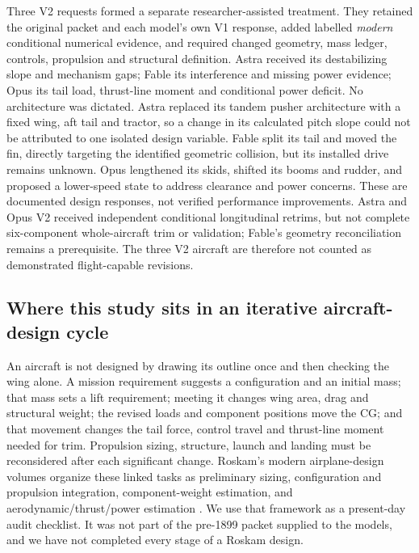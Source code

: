 \documentclass[11pt,a4paper]{article}
\begin{document}
Three V2 requests formed a separate researcher-assisted treatment. They retained the original packet and each model's own V1 response, added labelled \emph{modern} conditional numerical evidence, and required changed geometry, mass ledger, controls, propulsion and structural definition. Astra received its destabilizing slope and mechanism gaps; Fable its interference and missing power evidence; Opus its tail load, thrust-line moment and conditional power deficit. No architecture was dictated. Astra replaced its tandem pusher architecture with a fixed wing, aft tail and tractor, so a change in its calculated pitch slope could not be attributed to one isolated design variable. Fable split its tail and moved the fin, directly targeting the identified geometric collision, but its installed drive remains unknown. Opus lengthened its skids, shifted its booms and rudder, and proposed a lower-speed state to address clearance and power concerns. These are documented design responses, not verified performance improvements. Astra and Opus V2 received independent conditional longitudinal retrims, but not complete six-component whole-aircraft trim or validation; Fable's geometry reconciliation remains a prerequisite. The three V2 aircraft are therefore not counted as demonstrated flight-capable revisions.

\subsection{Where this study sits in an iterative aircraft-design cycle}
An aircraft is not designed by drawing its outline once and then checking the wing alone. A mission requirement suggests a configuration and an initial mass; that mass sets a lift requirement; meeting it changes wing area, drag and structural weight; the revised loads and component positions move the CG; and that movement changes the tail force, control travel and thrust-line moment needed for trim. Propulsion sizing, structure, launch and landing must be reconsidered after each significant change. Roskam's modern airplane-design volumes organize these linked tasks as preliminary sizing, configuration and propulsion integration, component-weight estimation, and aerodynamic/thrust/power estimation \cite{ref36,ref37,ref38,ref39}. We use that framework as a present-day audit checklist. It was not part of the pre-1899 packet supplied to the models, and we have not completed every stage of a Roskam design.
\end{document}
